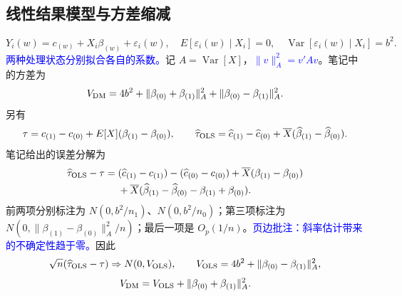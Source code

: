 \documentclass[11pt,a4paper]{article}
\newcommand{\inkblue}[1]{\textcolor{blue}{#1}}
\begin{document}
\subsection{线性结果模型与方差缩减}
\[
Y_i(w)=c_{(w)}+X_i\beta_{(w)}+\varepsilon_i(w),\quad
E[\varepsilon_i(w)\mid X_i]=0,\quad
\operatorname{Var}[\varepsilon_i(w)\mid X_i]=b^2.
\]
\inkblue{两种处理状态分别拟合各自的系数。}记 $A=\operatorname{Var}[X]$，\inkblue{$\|v\|_A^2=v'Av$}。笔记中的方差为
\[
V_{\rm DM}=4b^2+\|\beta_{(0)}+\beta_{(1)}\|_A^2
 +\|\beta_{(0)}-\beta_{(1)}\|_A^2.
\]
另有
\[
\tau=c_{(1)}-c_{(0)}+E[X](\beta_{(1)}-\beta_{(0)}),\qquad
\widehat\tau_{\rm OLS}=\widehat c_{(1)}-\widehat c_{(0)}
 +\overline X(\widehat\beta_{(1)}-\widehat\beta_{(0)}).
\]
笔记给出的误差分解为
\begin{align*}
\widehat\tau_{\rm OLS}-\tau={}&(\widehat c_{(1)}-c_{(1)})-(\widehat c_{(0)}-c_{(0)})
 +\overline X(\beta_{(1)}-\beta_{(0)})\\
&+\overline X(\widehat\beta_{(1)}-\widehat\beta_{(0)}-\beta_{(1)}+\beta_{(0)}).
\end{align*}
前两项分别标注为 $N(0,b^2/n_1)$、$N(0,b^2/n_0)$；第三项标注为 $N(0,\|\beta_{(1)}-\beta_{(0)}\|_A^2/n)$；最后一项是 $O_p(1/n)$。\inkblue{页边批注：斜率估计带来的不确定性趋于零。}因此
\[
\sqrt n(\widehat\tau_{\rm OLS}-\tau)\Rightarrow N(0,V_{\rm OLS}),\qquad
V_{\rm OLS}=4b^2+\|\beta_{(0)}-\beta_{(1)}\|_A^2,
\]
\[
V_{\rm DM}=V_{\rm OLS}+\|\beta_{(0)}+\beta_{(1)}\|_A^2.
\]
\end{document}
